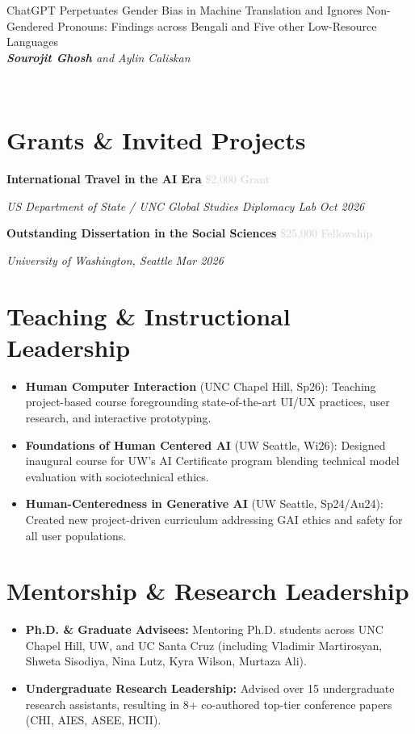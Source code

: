 \documentclass[10pt, letterpaper]{article}
\newcommand{\me}{\textbf{Sourojit Ghosh}}
\newcommand{\pubitem}[4]{%
  \stepcounter{totalpubs}
  \noindent
  \begin{minipage}[t]{0.82\linewidth}
    \numdef\thispubnum{\maxpubcount + 1 - \value{totalpubs}}
    \large{#1}\\
    \textit{\small #2}
  \end{minipage}%
  \hfill
  \begin{minipage}[t]{0.14\linewidth}\raggedleft
    \raisebox{-5pt}{#3}\\[2pt]
    \textcolor{lightgray}{\footnotesize #4}
  \end{minipage}
  \vspace{5pt}
}
\begin{document}
\pubitem{ChatGPT Perpetuates Gender Bias in Machine Translation and Ignores Non-Gendered Pronouns: Findings across Bengali and Five other Low-Resource Languages}
{\me \vspace{0.1em} and Aylin Caliskan}
{AIES '23}{}

\section{Grants \& Invited Projects}
\noindent\textbf{International Travel in the AI Era} \hfill \textcolor{lightgray}{\small \$2,000 Grant}\par
\textit{US Department of State / UNC Global Studies Diplomacy Lab} \hfill \textit{Oct 2026}\par

\noindent\textbf{Outstanding Dissertation in the Social Sciences} \hfill \textcolor{lightgray}{\small \$25,000 Fellowship}\par
\textit{University of Washington, Seattle} \hfill \textit{Mar 2026}\par

\section{Teaching \& Instructional Leadership}
\begin{itemize}[leftmargin=1.2em, itemsep=2pt, topsep=2pt]
  \item \textbf{Human Computer Interaction} (UNC Chapel Hill, Sp26): Teaching project-based course foregrounding state-of-the-art UI/UX practices, user research, and interactive prototyping.
  \item \textbf{Foundations of Human Centered AI} (UW Seattle, Wi26): Designed inaugural course for UW's AI Certificate program blending technical model evaluation with sociotechnical ethics.
  \item \textbf{Human-Centeredness in Generative AI} (UW Seattle, Sp24/Au24): Created new project-driven curriculum addressing GAI ethics and safety for all user populations.

\end{itemize}

\section{Mentorship \& Research Leadership}
\begin{itemize}[leftmargin=1.2em, itemsep=1pt, topsep=1pt]
  \item \textbf{Ph.D. \& Graduate Advisees:} Mentoring Ph.D. students across UNC Chapel Hill, UW, and UC Santa Cruz (including Vladimir Martirosyan, Shweta Sisodiya, Nina Lutz, Kyra Wilson, Murtaza Ali).
  \item \textbf{Undergraduate Research Leadership:} Advised over 15 undergraduate research assistants, resulting in 8+ co-authored top-tier conference papers (CHI, AIES, ASEE, HCII).
\end{itemize}
\end{document}
